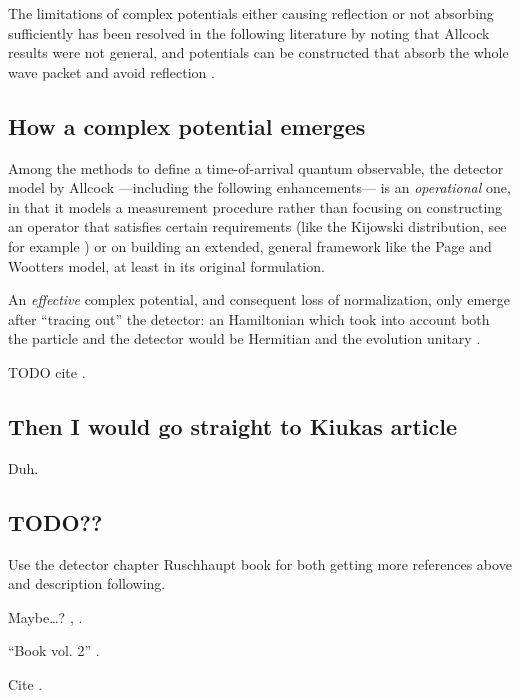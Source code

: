 The limitations of complex potentials either causing reflection
or not absorbing sufficiently has been resolved
in the following literature
by noting that Allcock results were not general, and
potentials can be constructed that absorb the whole wave packet
and avoid reflection \parencite{Muga_TOAQM, Muga_CompositeAbsPot, ComplexAbsPot}.

\subsection{How a complex potential emerges}

Among the methods to define a time-of-arrival quantum observable,
the detector model by Allcock
---including the following enhancements---
is an \emph{operational} one,
in that it models a measurement procedure \parencite[\S 9]{Leavens_TOA}
rather than focusing on constructing an operator that satisfies certain requirements
(like the Kijowski distribution, see for example \cite[\S 8]{Leavens_TOA})
or on building an extended, general framework
like the Page and Wootters model, at least in its original formulation.

\citereset
An \emph{effective} complex potential, and consequent loss of normalization,
only emerge after ``tracing out'' the detector:
an Hamiltonian which took into account both the particle and the detector
would be Hermitian and the evolution unitary \parencite[\S 9]{Leavens_TOA}.

TODO cite \cite{Damborenea, Damborenea_atomic}.

\subsection{Then I would go straight to Kiukas article}

Duh.

\subsection*{TODO??}

Use the detector chapter Ruschhaupt book for both getting more references above and description following.

Maybe\dots? \cite{ProbCurrent}, \cite{Ruschhaupt_QMoT}.

``Book vol. 2'' \cite{TQM2:Detector}.

Cite \cite{Muga_ArrTimeOpNormal, Sudarshan_Zeno, Echanobe, Savvidou-1, Savvidou-2}.

